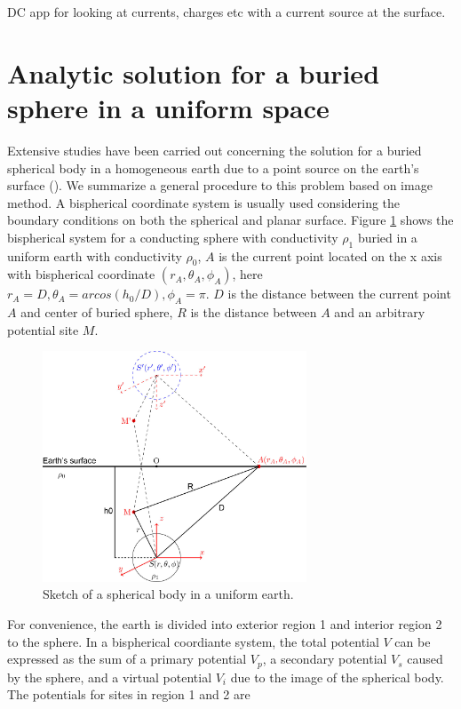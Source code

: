 \documentclass[11pt,letterpaper,leqno]{amsart}
\numberwithin{equation}{section}
\begin{document}
 \vspace{0.4cm}

DC app for looking at currents, charges etc with a current source at the surface.

 \vspace{0.4cm}

\section{Analytic solution for a buried sphere in a uniform space} 
Extensive studies have been carried out concerning the solution for a buried spherical body in a homogeneous earth due to a point source on the earth's surface (\citep{Nostrand1966,Large1971G,Merkel1971GP,Singh1976G,Snyder1973G,Tang2012}). We summarize a general procedure to this problem based on image method. A bispherical coordinate system  is usually used considering the boundary conditions on both the spherical and planar surface. 
Figure \ref{fig:sketch} shows the bispherical system for a conducting sphere with conductivity $\rho_1$ buried in a uniform earth with conductivity $\rho_0$, $A$ is the current point located on the x axis with bispherical coordinate $(r_A,\theta_A,\phi_A)$, here $r_A=D, \theta_A=arcos(h_0/D), \phi_A=\pi$. $D$ is the distance between the current point $A$ and center of buried sphere, $R$ is the distance between $A$ and an arbitrary potential site $M$. 
\begin{figure}[h!]
\centering
\includegraphics[width=0.7\textwidth]{sketch.jpg}
\caption{Sketch of a spherical body in a uniform earth.}
\label{fig:sketch}
\end{figure}
For convenience, the earth is divided into exterior region 1 and interior region 2 to the sphere.  In a bispherical coordiante system, the total potential $V$ can be expressed as the sum of a primary potential $V_p$, a secondary potential $V_s$ caused by the sphere, and a virtual potential $V_i$ due to the image of the spherical body. The potentials for sites in region 1 and 2 are
\end{document}
